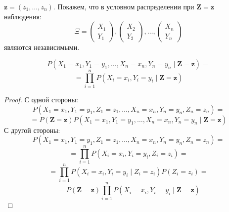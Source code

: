 $\mathbf{z}=(z_1,\ldots,z_n)$.
Покажем, что в условном распределении при $\mathbf{Z}=\mathbf{z}$ наблюдения:
$$
\Xi = 
\begin{pmatrix}
        X_1 \\
        Y_1
    \end{pmatrix},
    \begin{pmatrix}
        X_2 \\
        Y_2
    \end{pmatrix}, \ldots,
    \begin{pmatrix}
        X_n \\
        Y_n
    \end{pmatrix}
$$
являются независимыми. 

\begin{lemma}\label{ci_for_samples}
    $$
    P(X_1=x_1,Y_1=y_1,\ldots,X_n=x_n,Y_n=y_n \mid \mathbf{Z}=\mathbf{z})=
    $$
    $$
    =\prod_{i=1}^n P(X_i=x_i, Y_i=y_i \mid \mathbf{Z}=\mathbf{z})
    $$
\end{lemma}
\begin{proof}
    С одной стороны:
    $$
    P(X_1=x_1,Y_1=y_1,Z_1=z_1,\ldots,X_n=x_n,Y_n=y_n,Z_n=z_n)=
    $$
    $$
    =P(\mathbf{Z}=\mathbf{z}) P(X_1=x_1,Y_1=y_1,\ldots,X_n=x_n,Y_n=y_n \mid \mathbf{Z}=\mathbf{z}) 
    $$
    С другой стороны:
    $$
    P(X_1=x_1,Y_1=y_1,Z_1=z_1,\ldots,X_n=x_n,Y_n=y_n,Z_n=z_n)=
    $$
    $$
    =\prod_{i=1}^n P(X_i=x_i, Y_i=y_i, Z_i=z_i)=
    $$
    $$
    =\prod_{i=1}^n P(X_i=x_i, Y_i=y_i \mid Z_i=z_i)P(Z_i=z_i)=
    $$
    $$
    =P(\mathbf{Z}=\mathbf{z})\prod_{i=1}^n P(X_i=x_i, Y_i=y_i \mid \mathbf{Z}=\mathbf{z})
    $$
\end{proof}

